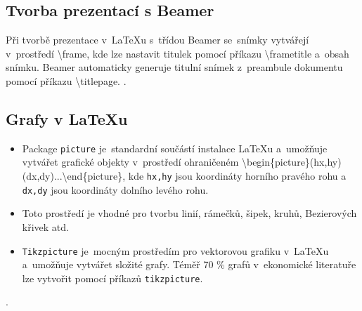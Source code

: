 \documentclass[a4paper, 11pt]{article}
\begin{document}
\subsection{Tvorba prezentací s Beamer}
Při tvorbě prezentace v~\LaTeX{}u s~třídou Beamer se~snímky vytvářejí v~prostředí \textbackslash frame, 
kde lze nastavit titulek pomocí příkazu \textbackslash frametitle a~obsah snímku. 
Beamer automaticky generuje titulní snímek z~preambule dokumentu pomocí příkazu \textbackslash titlepage.
\cite{Cerny2011}.

\subsection{Grafy v \LaTeX{}u}
\begin{itemize}
    \item Package \texttt{picture} je~standardní součástí instalace \LaTeX{}u a~umožňuje vytvářet grafické objekty v~prostředí ohraničeném \textbackslash begin\{picture\}(hx,hy)(dx,dy)...\textbackslash end\{picture\}, kde \texttt{hx,hy} jsou koordináty horního pravého rohu a \texttt{dx,dy} jsou koordináty dolního levého rohu.
    \item Toto prostředí je vhodné pro tvorbu linií, rámečků, šipek, kruhů, Bezierových křivek atd. 
    \item \texttt{Tikzpicture} je~mocným prostředím pro vektorovou grafiku v~\LaTeX{}u a~umožňuje vytvářet složité grafy. Téměř 70 \% grafů v~ekonomické literatuře lze vytvořit pomocí příkazů \texttt{tikzpicture}.
\end{itemize}
\cite{SedaPavelVGIL}.


\newpage

\renewcommand{\refname}{Literatura}

\end{document}
